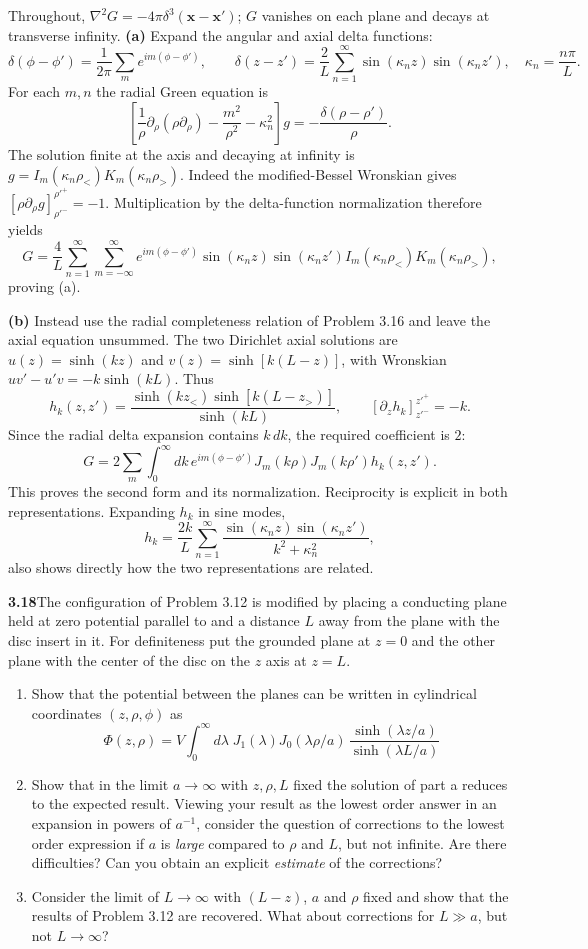 Throughout, $\nabla^2G=-4\pi\delta^3(\mathbf x-\mathbf x')$;
$G$ vanishes on each plane and decays at transverse infinity.
\textbf{(a)} Expand the angular and axial delta functions:
\[
\delta(\phi-\phi')=\frac1{2\pi}\sum_me^{im(\phi-\phi')},\qquad
\delta(z-z')=\frac2L\sum_{n=1}^\infty\sin(\kappa_nz)\sin(\kappa_nz'),
\quad\kappa_n=\frac{n\pi}L.
\]
For each $m,n$ the radial Green equation is
\[
\left[\frac1\rho\partial_\rho(\rho\partial_\rho)
-\frac{m^2}{\rho^2}-\kappa_n^2\right]g
=-\frac{\delta(\rho-\rho')}{\rho}.
\]
The solution finite at the axis and decaying at infinity is
$g=I_m(\kappa_n\rho_<)K_m(\kappa_n\rho_>)$.
Indeed the modified-Bessel Wronskian gives
$[\rho\partial_\rho g]_{\rho'^-}^{\rho'^+}=-1$.
Multiplication by the delta-function normalization therefore yields
\[
G=\frac4L\sum_{n=1}^\infty\sum_{m=-\infty}^\infty
 e^{im(\phi-\phi')}\sin(\kappa_nz)\sin(\kappa_nz')
 I_m(\kappa_n\rho_<)K_m(\kappa_n\rho_>),
\]
proving (a).

\textbf{(b)} Instead use the radial completeness relation of
Problem 3.16 and leave the axial equation unsummed.  The two
Dirichlet axial solutions are $u(z)=\sinh(kz)$ and
$v(z)=\sinh[k(L-z)]$, with Wronskian
$uv'-u'v=-k\sinh(kL)$.  Thus
\[
h_k(z,z')=\frac{\sinh(kz_<)\sinh[k(L-z_>)]}{\sinh(kL)},
\qquad [\partial_zh_k]_{z'^-}^{z'^+}=-k.
\]
Since the radial delta expansion contains $k\,dk$, the required
coefficient is $2$:
\[
G=2\sum_m\int_0^\infty dk\,e^{im(\phi-\phi')}
J_m(k\rho)J_m(k\rho')h_k(z,z').
\]
This proves the second form and its normalization.  Reciprocity is
explicit in both representations.  Expanding $h_k$ in sine modes,
\[
h_k=\frac{2k}{L}\sum_{n=1}^\infty
\frac{\sin(\kappa_nz)\sin(\kappa_nz')}{k^2+\kappa_n^2},
\]
also shows directly how the two representations are related.

\par\bigskip
\noindent\textbf{3.18}\quad The configuration of Problem 3.12 is modified by placing a conducting plane held at zero potential parallel to and a distance $L$ away from the plane with the disc insert in it. For definiteness put the grounded plane at $z=0$ and the other plane with the center of the disc on the $z$ axis at $z=L$.
\begin{enumerate}
\item[(a)] Show that the potential between the planes can be written in cylindrical coordinates $(z,\rho,\phi)$ as
\[
\Phi(z,\rho)=V\int_{0}^{\infty}d\lambda\;J_{1}(\lambda)J_{0}(\lambda\rho/a)\,\frac{\sinh(\lambda z/a)}{\sinh(\lambda L/a)}
\]
\item[(b)] Show that in the limit $a\to\infty$ with $z,\rho,L$ fixed the solution of part a reduces to the expected result. Viewing your result as the lowest order answer in an expansion in powers of $a^{-1}$, consider the question of corrections to the lowest order expression if $a$ is \emph{large} compared to $\rho$ and $L$, but not infinite. Are there difficulties? Can you obtain an explicit \emph{estimate} of the corrections?
\item[(c)] Consider the limit of $L\to\infty$ with $(L-z)$, $a$ and $\rho$ fixed and show that the results of Problem 3.12 are recovered. What about corrections for $L\gg a$, but not $L\to\infty$?
\end{enumerate}
\solution

